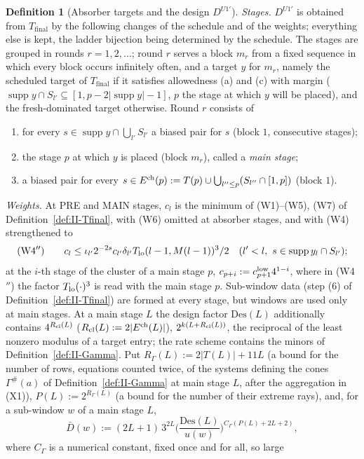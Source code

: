 \documentclass[10pt]{amsart}
\theoremstyle{definition}
\newtheorem{definition}[theorem]{Definition}
\theoremstyle{remark}
\newcommand{\supp}{\operatorname{supp}}
\begin{document}
\begin{definition}[Absorber targets and the design $D^{U1'}$]
\emph{Stages.}  $D^{U1'}$ is obtained from $T_{\mathrm{final}}$ by the following
changes of the schedule and of the weights; everything else is kept, the
ladder bijection being determined by the schedule.  The stages are grouped in
rounds $r=1,2,\dots$; round $r$ serves a block $m_r$ from a fixed sequence in
which every block occurs infinitely often, and a target $y$ for $m_r$, namely
the scheduled target of $T_{\mathrm{final}}$ if it satisfies allowedness (a)
and (c) with margin ($\supp y\cap S_{l'}\subseteq[1,p-2|\supp y|-1]$, $p$ the stage
at which $y$ will be placed), and the fresh-dominated target otherwise.  Round
$r$ consists of
\begin{enumerate}
\item[PRE:] for every $s\in\supp y\cap\bigcup_{l'}S_{l'}$ a biased pair for $s$
(block $1$, consecutive stages);
\item[MAIN:] the stage $p$ at which $y$ is placed (block $m_r$), called a
\emph{main stage};
\item[CLUSTER:] a biased pair for every $s\in E^{\rm ch}(p):=T(p)\cup\bigcup_{l''\le p}
(S_{l''}\cap[1,p])$ (block $1$).
\end{enumerate}
\emph{Weights.}  At PRE and MAIN stages, $c_l$ is the minimum of (W1)--(W5),
(W7) of Definition~\ref{def:II-Tfinal}, with (W6) omitted at absorber stages,
and with (W4) strengthened to
\[
 \text{(W4$''$)}\qquad c_l\le\iota_{l'}2^{-2s}c_{l'}\delta_{l'}T_{\rm lo}(l-1,M(l-1))^3/2
 \quad(l'<l,\ s\in\supp y_l\cap S_{l'}) ;
\]
at the $i$-th stage of the cluster of a main stage $p$, $c_{p+i}:=c^{\rm low}_{p+1}
4^{1-i}$, where in (W4$''$) the factor $T_{\rm lo}(\cdot)^3$ is read with the main
stage $p$.  Sub-window data (step (6) of Definition~\ref{def:II-Tfinal}) are
formed at every stage, but windows are used only at main stages.  At a main
stage $L$ the design factor $\mathrm{Des}(L)$ additionally contains $4^{R_{\rm
cl}(L)}$ ($R_{\rm cl}(L):=2|E^{\rm ch}(L)|$), $2^{k(L+R_{\rm cl}(L))}$, the reciprocal
of the least nonzero modulus of a target entry; the rate scheme contains the
minors of Definition~\ref{def:II-Gamma}.  Put $R_\Gamma(L):=2|T(L)|+11L$
(a bound for the number of rows, equations counted twice, of the systems
defining the cones $\Gamma^\#(a)$ of Definition~\ref{def:II-Gamma} at main
stage $L$, after the aggregation in (X1)), $P(L):=2^{R_\Gamma(L)}$ (a bound
for the number of their extreme rays), and, for a sub-window $w$ of a main
stage $L$,
\[
 \bar D(w):=(2L+1)\,3^{2L}\Big(\frac{\mathrm{Des}(L)}{u(w)}\Big)^{C_\Gamma
 (P(L)+2L+2)},
\]
where $C_\Gamma$ is a numerical constant, fixed once and for all, so large

\end{definition}
\end{document}
